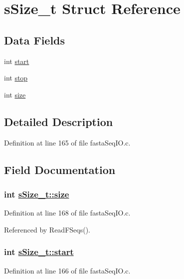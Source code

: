 \hypertarget{structsSize__t}{
\section{s\-Size\_\-t Struct Reference}
\label{structsSize__t}
}
\subsection*{Data Fields}
\begin{CompactItemize}
\item 
int \hyperlink{structsSize__t_o0}{start}
\item 
int \hyperlink{structsSize__t_o1}{stop}
\item 
int \hyperlink{structsSize__t_o2}{size}
\end{CompactItemize}


\subsection*{Detailed Description}




Definition at line 165 of file fasta\-Seq\-IO.c.

\subsection*{Field Documentation}
\hypertarget{structsSize__t_o2}{
\subsubsection[size]{\setlength{\rightskip}{0pt plus 5cm}int \hyperlink{structsSize__t_o2}{s\-Size\_\-t::size}}}
\label{structsSize__t_o2}




Definition at line 168 of file fasta\-Seq\-IO.c.

Referenced by Read\-FSeqs().\hypertarget{structsSize__t_o0}{
\subsubsection[start]{\setlength{\rightskip}{0pt plus 5cm}int \hyperlink{structsSize__t_o0}{s\-Size\_\-t::start}}}
\label{structsSize__t_o0}




Definition at line 166 of file fasta\-Seq\-IO.c.


